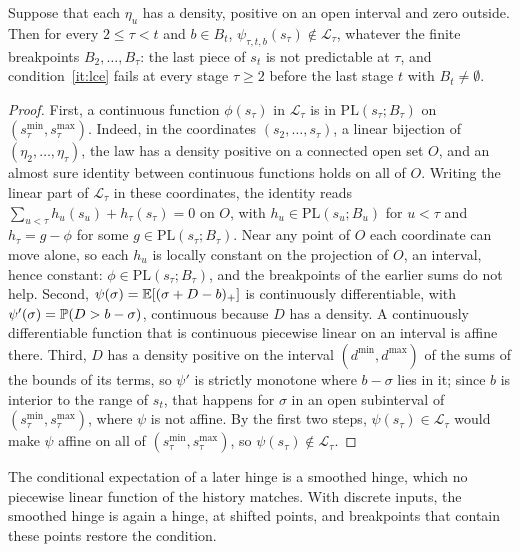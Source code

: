 \begin{proposition}
\label{prop:continuous-sums}
Suppose that each $\eta_u$ has a density, positive on an open interval and zero outside.
Then for every $2 \le \tau < t$ and $b \in B_t$, $\psi_{\tau,t,b}(s_\tau) \notin \mathcal L_\tau$, whatever the finite breakpoints $B_2, \dots, B_\tau$:
the last piece of $s_t$ is not predictable at $\tau$, and condition~\ref{it:lce} fails at every stage $\tau \ge 2$ before the last stage $t$ with $B_t \neq \emptyset$.
\end{proposition}

\begin{proof}
First, a continuous function $\phi(s_\tau)$ in $\mathcal L_\tau$ is in $\mathrm{PL}(s_\tau; B_\tau)$ on $(s_\tau^{\min}, s_\tau^{\max})$.
Indeed, in the coordinates $(s_2, \dots, s_\tau)$, a linear bijection of $(\eta_2, \dots, \eta_\tau)$, the law has a density positive on a connected open set $O$,
and an almost sure identity between continuous functions holds on all of $O$.
Writing the linear part of $\mathcal L_\tau$ in these coordinates, the identity reads $\sum_{u<\tau}h_u(s_u) + h_\tau(s_\tau) = 0$ on $O$, with $h_u \in \mathrm{PL}(s_u; B_u)$ for $u < \tau$ and $h_\tau = g - \phi$ for some $g \in \mathrm{PL}(s_\tau; B_\tau)$.
Near any point of $O$ each coordinate can move alone, so each $h_u$ is locally constant on the projection of $O$, an interval, hence constant: $\phi \in \mathrm{PL}(s_\tau; B_\tau)$, and the breakpoints of the earlier sums do not help.
Second, $\psi(\sigma) = \mathbb{E}[(\sigma + D - b)_+]$ is continuously differentiable, with $\psi'(\sigma) = \mathbb{P}(D > b - \sigma)$, continuous because $D$ has a density.
A continuously differentiable function that is continuous piecewise linear on an interval is affine there.
Third, $D$ has a density positive on the interval $(d^{\min}, d^{\max})$ of the sums of the bounds of its terms, so $\psi'$ is strictly monotone where $b - \sigma$ lies in it;
since $b$ is interior to the range of $s_t$, that happens for $\sigma$ in an open subinterval of $(s_\tau^{\min}, s_\tau^{\max})$, where $\psi$ is not affine.
By the first two steps, $\psi(s_\tau) \in \mathcal L_\tau$ would make $\psi$ affine on all of $(s_\tau^{\min}, s_\tau^{\max})$, so $\psi(s_\tau) \notin \mathcal L_\tau$.
\end{proof}

The conditional expectation of a later hinge is a smoothed hinge, which no piecewise linear function of the history matches.
With discrete inputs, the smoothed hinge is again a hinge, at shifted points, and breakpoints that contain these points restore the condition.

